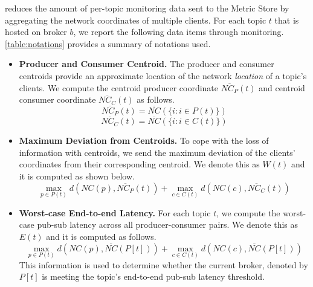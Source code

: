 \epulsar{} reduces the amount of per-topic monitoring data sent to the Metric Store by aggregating the network coordinates of multiple clients. For each topic $t$ that is hosted on broker $b$, we report the following data items through monitoring. \cref{table:notations} provides a summary of notations used.
\begin{itemize}
\item \textbf{Producer and Consumer Centroid.} The producer and consumer centroids provide an approximate location of the network \textit{location} of a topic's clients. We compute the centroid producer coordinate $\overline{NC_P}\left( t \right)$ and centroid consumer coordinate $\overline{NC_C}\left( t \right)$ as follows.
\begin{equation*}
\overline{NC_P}\left( t \right) = \overline{NC} \left( \{ i : i \in P\left( t \right) \} \right)
\end{equation*}
\begin{equation*}
\overline{NC_C}\left( t \right) = \overline{NC} \left( \{ i : i \in C\left( t \right) \} \right)
\end{equation*}
\item \textbf{Maximum Deviation from Centroids.} To cope with the loss of information with centroids, we send the maximum deviation of the clients' coordinates from their corresponding centroid. We denote this as $W \left( t \right)$ and it is computed as shown below.
\begin{equation*}
\max\limits_{p \in P\left( t \right)} d \left( NC \left( p\right), \overline{NC_P}\left( t \right)\right) + \max\limits_{c \in C\left( t \right)} d \left( NC \left( c\right), \overline{NC_C}\left( t \right)\right)
\end{equation*}
\item \textbf{Worst-case End-to-end Latency.} For each topic $t$, we compute the worst-case pub-sub latency across all producer-consumer pairs. We denote this as $E \left( t \right)$ and it is computed as follows. 
\begin{equation*}
\max\limits_{p \in P\left( t \right)} d \left( NC \left( p\right), \overline{NC}\left( P\left[ t \right] \right) \right) + \max\limits_{c \in C\left( t \right)} d \left( NC \left( c\right), \overline{NC}\left( P\left[ t \right] \right) \right) 
\end{equation*}
This information is used to determine whether the current broker, denoted by $P\left[ t \right]$ is meeting the topic's end-to-end pub-sub latency threshold.
\end{itemize}

